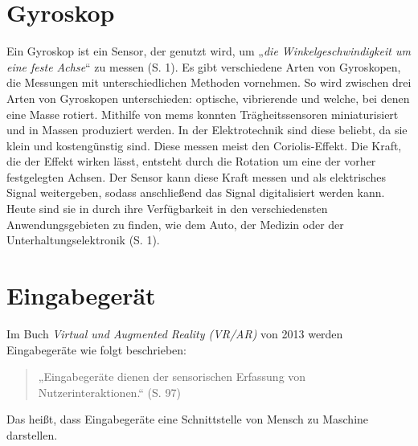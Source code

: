 \section{Gyroskop}
Ein Gyroskop ist ein Sensor, der genutzt wird, um „\textit{die Winkelgeschwindigkeit um eine feste Achse}“ zu messen (S. 1)\cite{armeniseAdvancesGyroscopeTechnologies2010}.
Es gibt verschiedene Arten von Gyroskopen, die Messungen mit unterschiedlichen Methoden vornehmen.
So wird zwischen drei Arten von Gyroskopen unterschieden: optische, vibrierende und welche, bei denen eine Masse rotiert.
Mithilfe von \ac{mems} konnten Trägheitssensoren miniaturisiert und in Massen produziert werden.
In der Elektrotechnik sind diese beliebt, da sie klein und kostengünstig sind\cite{maenakaMEMSInertialSensors2008}.
Diese messen meist den Coriolis-Effekt. Die Kraft, die der Effekt wirken lässt, entsteht durch die Rotation um eine der vorher festgelegten Achsen.
Der Sensor kann diese Kraft messen und als elektrisches Signal weitergeben, sodass anschließend das Signal digitalisiert werden kann\cite{utmelMPU6050ModuleDatasheet}.
Heute sind sie in durch ihre Verfügbarkeit in den verschiedensten Anwendungsgebieten zu finden, wie dem Auto, der Medizin oder der Unterhaltungselektronik (S. 1)\cite{armeniseAdvancesGyroscopeTechnologies2010}.

\section{Eingabegerät}
Im Buch \textit{Virtual und Augmented Reality (VR/AR)} von 2013 werden Eingabegeräte wie folgt beschrieben:

\begin{quote}
    „Eingabegeräte dienen der sensorischen Erfassung von Nutzerinteraktionen.“ (S. 97)\cite{doernerVirtualUndAugmented2013}
\end{quote}

Das heißt, dass Eingabegeräte eine Schnittstelle von Mensch zu Maschine darstellen.